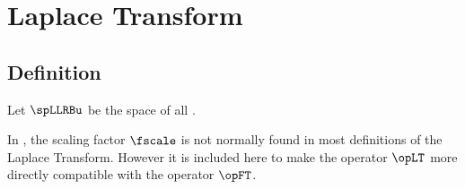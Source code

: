 \chapter{Laplace Transform}

\section{Definition}
\begin{definition}
\label{def:opLT}
Let $\spLLRBu$ be the space of all 
.\\
\end{definition}

In , the scaling factor $\fscale$ is not normally found 
in most definitions of the Laplace Transform.
However it is included here to make the operator $\opLT$ more directly compatible 
with the  operator $\opFT$.

